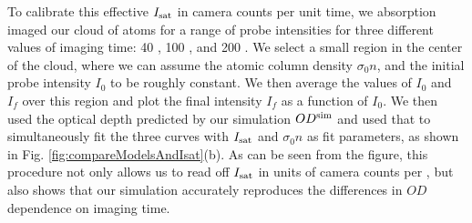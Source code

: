 To calibrate this effective $I_{\rm{sat}}$ in camera counts per unit time, we absorption imaged our cloud of \K{} atoms for a range of probe intensities for three different values of imaging time: 40 \us{}, 100 \us{}, and 200 \us{}. We select a small region in the center of the cloud, where we can assume the atomic column density $\sigma_0 n$, and the initial probe intensity $I_0$ to be roughly constant. We then average the values of $I_0$ and $I_f$ over this region and plot the final intensity $I_f$ as a function of $I_0$. We then used the optical depth predicted by our simulation $OD^{\rm{sim}}$ and used that to simultaneously fit the three curves with $I_{\rm{sat}}$ and $\sigma_0 n$ as fit parameters, as shown in Fig. \ref{fig:compareModelsAndIsat}(b). As can be seen from the figure, this procedure not only allows us to read off $I_{\rm{sat}}$ in units of camera counts per \us{}, but also shows that our simulation accurately reproduces the differences in $OD$ dependence on imaging time.  
%
%
%
%



